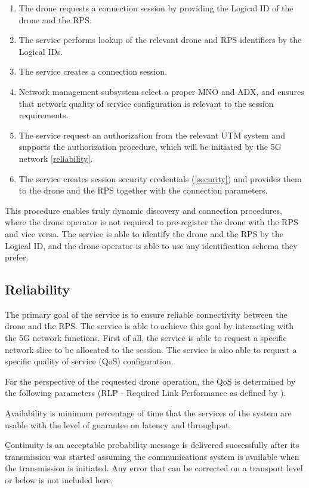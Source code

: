 \documentclass[a4paper,conference]{IEEEtran}
\begin{document}
\begin{enumerate}
\item The drone requests a connection session by providing the Logical ID of the drone and the RPS.
\item The service performs lookup of the relevant drone and RPS identifiers by the Logical IDs.
\item The service creates a connection session.
\item Network management subsystem select a proper MNO and ADX, and ensures that network quality of service configuration is relevant to the session requirements.
\item The service request an authorization from the relevant UTM system and supports the authorization procedure, which will be initiated by the 5G network \ref{reliability}.
\item The service creates session security credentials (\ref{security}) and provides them to the drone and the RPS together with the connection parameters.
\end{enumerate}

This procedure enables truly dynamic discovery and connection procedures, where the drone operator is not required to pre-register the drone with the RPS and vice versa. The service is able to identify the drone and the RPS by the Logical ID, and the drone operator is able to use any identification schema they prefer.

\subsection{Reliability}

The primary goal of the service is to ensure reliable connectivity between the drone and the RPS. The service is able to achieve this goal by interacting with the 5G network functions. First of all, the service is able to request a specific network slice to be allocated to the session. The service is also able to request a specific quality of service (QoS) configuration.

For the perspective of the requested drone operation, the QoS is determined by the following parameters (RLP - Required Link Performance as defined by \cite{rtca:do377a}).

{\b Availability} is minimum percentage of time that the services of the system are usable with the level of guarantee on latency and throughput.

{\b Continuity} is an acceptable probability message is delivered successfully after its transmission was started assuming the communications system is available when the transmission is initiated. Any error that can be corrected on a transport level or below is not included here.
\end{document}
